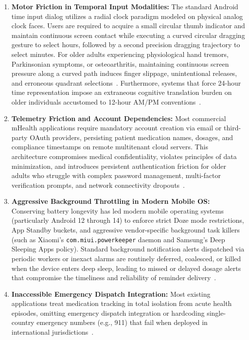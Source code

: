 \documentclass[11pt,a4paper]{article}
\begin{document}
\begin{enumerate}[leftmargin=*]
    \item \textbf{Motor Friction in Temporal Input Modalities:} The standard Android time input dialog utilizes a radial clock paradigm modeled on physical analog clock faces. Users are required to acquire a small circular thumb indicator and maintain continuous screen contact while executing a curved circular dragging gesture to select hours, followed by a second precision dragging trajectory to select minutes. For older adults experiencing physiological hand tremors, Parkinsonian symptoms, or osteoarthritis, maintaining continuous screen pressure along a curved path induces finger slippage, unintentional releases, and erroneous quadrant selections~\cite{trewin2013physical,siek2006fat}. Furthermore, systems that force 24-hour time representation impose an extraneous cognitive translation burden on older individuals accustomed to 12-hour AM/PM conventions~\cite{kurniawan2008older}.

    \item \textbf{Telemetry Friction and Account Dependencies:} Most commercial mHealth applications require mandatory account creation via email or third-party OAuth providers, persisting patient medication names, dosages, and compliance timestamps on remote multitenant cloud servers. This architecture compromises medical confidentiality, violates principles of data minimization, and introduces persistent authentication friction for older adults who struggle with complex password management, multi-factor verification prompts, and network connectivity dropouts~\cite{kleppmann2019local,wildenbos2018aging}.

    \item \textbf{Aggressive Background Throttling in Modern Mobile OS:} Conserving battery longevity has led modern mobile operating systems (particularly Android 12 through 14) to enforce strict Doze mode restrictions, App Standby buckets, and aggressive vendor-specific background task killers (such as Xiaomi's \texttt{com.miui.powerkeeper} daemon and Samsung's Deep Sleeping Apps policy). Standard background notification alerts dispatched via periodic workers or inexact alarms are routinely deferred, coalesced, or killed when the device enters deep sleep, leading to missed or delayed dosage alerts that compromise the timeliness and reliability of reminder delivery~\cite{aosp2024offline}.

    \item \textbf{Inaccessible Emergency Dispatch Integration:} Most existing applications treat medication tracking in total isolation from acute health episodes, omitting emergency dispatch integration or hardcoding single-country emergency numbers (e.g., 911) that fail when deployed in international jurisdictions~\cite{etsi2020emergency,itu2008emergency}.
\end{enumerate}
\end{document}
